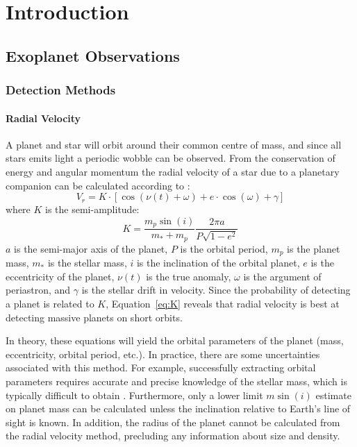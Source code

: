 \chapter{Introduction}
\label{chap:intro}

\section{Exoplanet Observations}
\subsection{Detection Methods}
\subsubsection{Radial Velocity}
\label{sec:RV}
A planet and star will orbit around their common centre of mass, and since all stars emits light a periodic wobble can be observed. 
From the conservation of energy and angular momentum the radial velocity of a star due to a planetary companion can be calculated according to \citep{Beauge2007}:
\begin{equation}
V_r = K \cdot [\cos(\nu(t) + \omega) + e\cdot \cos(\omega) + \gamma]
\end{equation}
where $K$ is the semi-amplitude:
\begin{equation}
K = \frac{m_p \sin(i)}{m_* + m_p} \frac{2\pi a}{P\sqrt{1-e^2}}
\label{eq:K}
\end{equation}
$a$ is the semi-major axis of the planet, $P$ is the orbital period, $m_p$ is the planet mass, $m_*$ is the stellar mass, $i$ is the inclination of the orbital planet, $e$ is the eccentricity of the planet, $\nu(t)$ is the true anomaly, $\omega$ is the argument of periastron, and $\gamma$ is the stellar drift in velocity.
Since the probability of detecting a planet is related to $K$, Equation~\ref{eq:K} reveals that radial velocity is best at detecting massive planets on short orbits. 

In theory, these equations will yield the orbital parameters of the planet (mass, eccentricity, orbital period, etc.). 
In practice, there are some uncertainties associated with this method.
For example, successfully extracting orbital parameters requires accurate and precise knowledge of the stellar mass, which is typically difficult to obtain \citep[e.g.][]{Brown2011}.
Furthermore, only a lower limit $m\sin(i)$ estimate on planet mass can be calculated unless the inclination relative to Earth's line of sight is known. 
In addition, the radius of the planet cannot be calculated from the radial velocity method, precluding any information about size and density.

